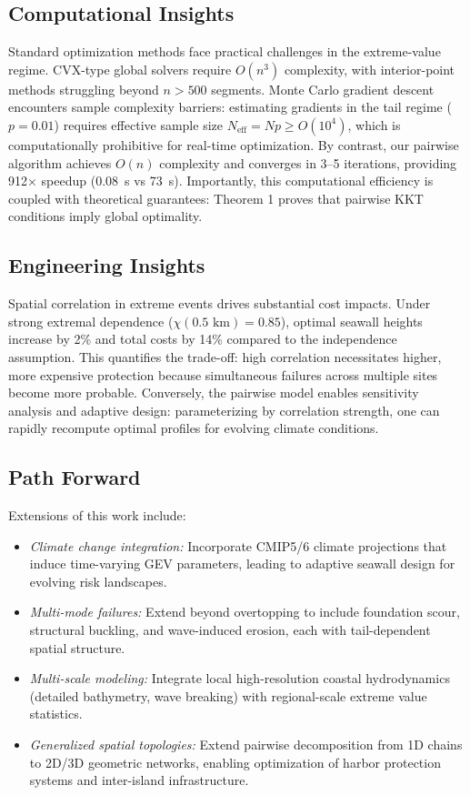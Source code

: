 \documentclass[12pt]{article}
\theoremstyle{definition}
\begin{document}
\subsection*{Computational Insights}

Standard optimization methods face practical challenges in the extreme-value regime. CVX-type global solvers require $O(n^3)$ complexity, with interior-point methods struggling beyond $n > 500$ segments. Monte Carlo gradient descent encounters sample complexity barriers: estimating gradients in the tail regime ($p=0.01$) requires effective sample size $N_{\text{eff}} = Np \geq O(10^4)$, which is computationally prohibitive for real-time optimization. By contrast, our pairwise algorithm achieves $O(n)$ complexity and converges in 3--5 iterations, providing 912× speedup (0.08~s vs 73~s). Importantly, this computational efficiency is coupled with theoretical guarantees: Theorem 1 proves that pairwise KKT conditions imply global optimality.

\subsection*{Engineering Insights}

Spatial correlation in extreme events drives substantial cost impacts. Under strong extremal dependence ($\chi(0.5 \text{ km}) = 0.85$), optimal seawall heights increase by 2\% and total costs by 14\% compared to the independence assumption. This quantifies the trade-off: high correlation necessitates higher, more expensive protection because simultaneous failures across multiple sites become more probable. Conversely, the pairwise model enables sensitivity analysis and adaptive design: parameterizing by correlation strength, one can rapidly recompute optimal profiles for evolving climate conditions.

\subsection*{Path Forward}

Extensions of this work include:
\begin{itemize}
    \item \emph{Climate change integration:} Incorporate CMIP5/6 climate projections that induce time-varying GEV parameters, leading to adaptive seawall design for evolving risk landscapes.
    \item \emph{Multi-mode failures:} Extend beyond overtopping to include foundation scour, structural buckling, and wave-induced erosion, each with tail-dependent spatial structure.
    \item \emph{Multi-scale modeling:} Integrate local high-resolution coastal hydrodynamics (detailed bathymetry, wave breaking) with regional-scale extreme value statistics.
    \item \emph{Generalized spatial topologies:} Extend pairwise decomposition from 1D chains to 2D/3D geometric networks, enabling optimization of harbor protection systems and inter-island infrastructure.
\end{itemize}
\end{document}
